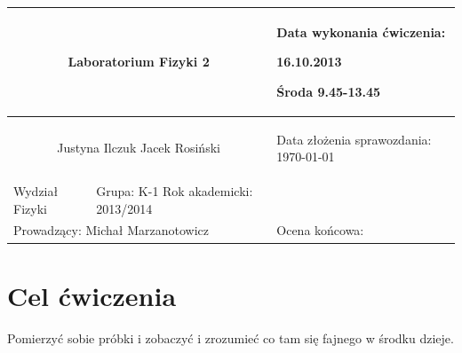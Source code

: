 \documentclass[a4paper,12pt]{article}
\author{Justyna Ilczuk, Jacek Rosiński}
\begin{document}
\begin{center}

    \begin{tabular}{ | m{5cm}| m{5cm} | m{5cm} |}
    \hline 
    \multicolumn{2}{|c|}{{ \Large \textbf{Laboratorium Fizyki 2}} }
    &  
    \begin{center}
    Data wykonania ćwiczenia:
    \end{center}
    \begin{center}
      16.10.2013 
    \end{center}
    \begin{center}
    Środa 9.45-13.45
    \end{center}
     \\ 
    
    \hline
    \multicolumn{2}{|c|}{Justyna Ilczuk \newline Jacek Rosiński}
    & \begin{center}
    {\small Data złożenia sprawozdania:} \newline \today
    \end{center}   \\
   	
   	\hline
    Wydział Fizyki & Grupa: K-1 \newline Rok akademicki: 2013/2014 &  \\
   	\hline
   	\multicolumn{2}{|l|}{Prowadzący: Michał Marzanotowicz} & \multicolumn{1}{|l|}{Ocena końcowa:}\\
    \hline
    \end{tabular}
\end{center}

\newpage

\pagestyle{fancy}
\fancyfoot[CO]{\ }
\fancyhead[RO]{\footnotesize{\thepage} }




\section{Cel ćwiczenia}
Pomierzyć sobie próbki i zobaczyć i zrozumieć co tam się fajnego w środku dzieje.
\end{document}
